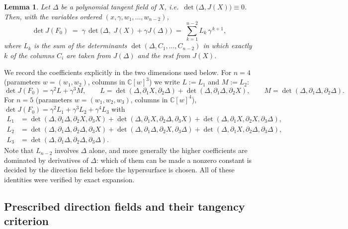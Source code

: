 \documentclass[11pt]{article}
\numberwithin{equation}{section}
\theoremstyle{plain}
\newtheorem{lemma}[theorem]{Lemma}
\theoremstyle{definition}
\theoremstyle{remark}
\newcommand{\C}{\mathbb{C}}
\begin{document}
\begin{lemma}\label{lem:JL}
Let $\Delta$ be a polynomial tangent field of $X$, i.e.\
$\det\bigl(\Delta,J(X)\bigr)\equiv0$. Then, with the variables ordered
$(x,\gamma,w_1,\dots,w_{n-2})$,
\[
\det J(F_0)\;=\;\gamma\,\det\bigl(\Delta,\;J(X)+\gamma J(\Delta)\bigr)
\;=\;\sum_{k=1}^{n-2}L_k\,\gamma^{\,k+1},
\]
where $L_k$ is the sum of the determinants $\det(\Delta,C_1,\dots,C_{n-2})$ in
which exactly $k$ of the columns $C_i$ are taken from $J(\Delta)$ and the rest
from $J(X)$.
\end{lemma}

We record the coefficients explicitly in the two dimensions used below. For
$n=4$ (parameters $w=(w_1,w_2)$, columns in $\C[w]^3$) we write $L:=L_1$ and
$M:=L_2$:
\[
\det J(F_0)=\gamma^2L+\gamma^3M,\qquad
L=\det(\Delta,\partial_1X,\partial_2\Delta)+\det(\Delta,\partial_1\Delta,\partial_2X),
\qquad
M=\det(\Delta,\partial_1\Delta,\partial_2\Delta).
\]
For $n=5$ (parameters $w=(w_1,w_2,w_3)$, columns in $\C[w]^4$),
$\det J(F_0)=\gamma^2L_1+\gamma^3L_2+\gamma^4L_3$ with
\begin{align*}
L_1&=\det(\Delta,\partial_1\Delta,\partial_2X,\partial_3X)
   +\det(\Delta,\partial_1X,\partial_2\Delta,\partial_3X)
   +\det(\Delta,\partial_1X,\partial_2X,\partial_3\Delta),\\
L_2&=\det(\Delta,\partial_1\Delta,\partial_2\Delta,\partial_3X)
   +\det(\Delta,\partial_1\Delta,\partial_2X,\partial_3\Delta)
   +\det(\Delta,\partial_1X,\partial_2\Delta,\partial_3\Delta),\\
L_3&=\det(\Delta,\partial_1\Delta,\partial_2\Delta,\partial_3\Delta).
\end{align*}
Note that $L_{n-2}$ involves $\Delta$ alone, and more generally the higher
coefficients are dominated by derivatives of $\Delta$: which of them can be made
a nonzero constant is decided by the direction field before the hypersurface is
chosen. All of these identities were verified by exact expansion.

\subsection{Prescribed direction fields and their tangency criterion}\label{subsec:forms}
\end{document}
